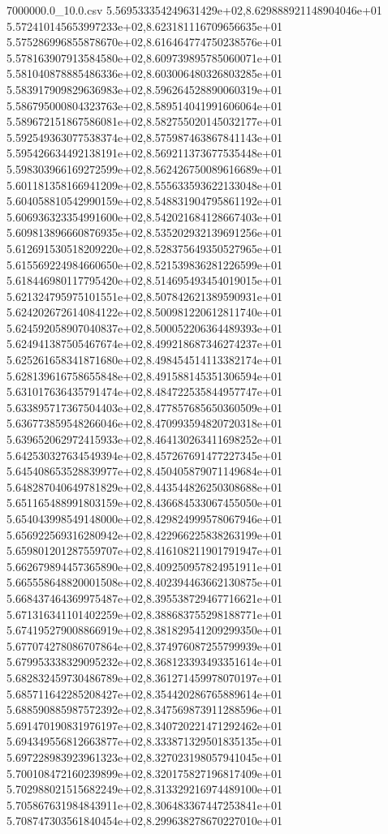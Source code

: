 \begin{filecontents*}{7000000.0_10.0.csv}
5.569533354249631429e+02,8.629888921148904046e+01
5.572410145653997233e+02,8.623181116709656635e+01
5.575286996855878670e+02,8.616464774750238576e+01
5.578163907913584580e+02,8.609739895785060071e+01
5.581040878885486336e+02,8.603006480326803285e+01
5.583917909829636983e+02,8.596264528890060319e+01
5.586795000804323763e+02,8.589514041991606064e+01
5.589672151867586081e+02,8.582755020145032177e+01
5.592549363077538374e+02,8.575987463867841143e+01
5.595426634492138191e+02,8.569211373677535448e+01
5.598303966169272599e+02,8.562426750089616689e+01
5.601181358166941209e+02,8.555633593622133048e+01
5.604058810542990159e+02,8.548831904795861192e+01
5.606936323354991600e+02,8.542021684128667403e+01
5.609813896660876935e+02,8.535202932139691256e+01
5.612691530518209220e+02,8.528375649350527965e+01
5.615569224984660650e+02,8.521539836281226599e+01
5.618446980117795420e+02,8.514695493454019015e+01
5.621324795975101551e+02,8.507842621389590931e+01
5.624202672614084122e+02,8.500981220612811740e+01
5.624592058907040837e+02,8.500052206364489393e+01
5.624941387505467674e+02,8.499218687346274237e+01
5.625261658341871680e+02,8.498454514113382174e+01
5.628139616758655848e+02,8.491588145351306594e+01
5.631017636435791474e+02,8.484722535844957747e+01
5.633895717367504403e+02,8.477857685650360509e+01
5.636773859548266046e+02,8.470993594820720318e+01
5.639652062972415933e+02,8.464130263411698252e+01
5.642530327634549394e+02,8.457267691477227345e+01
5.645408653528839977e+02,8.450405879071149684e+01
5.648287040649781829e+02,8.443544826250308688e+01
5.651165488991803159e+02,8.436684533067455050e+01
5.654043998549148000e+02,8.429824999578067946e+01
5.656922569316280942e+02,8.422966225838263199e+01
5.659801201287559707e+02,8.416108211901791947e+01
5.662679894457365890e+02,8.409250957824951911e+01
5.665558648820001508e+02,8.402394463662130875e+01
5.668437464369975487e+02,8.395538729467716621e+01
5.671316341101402259e+02,8.388683755298188771e+01
5.674195279008866919e+02,8.381829541209299350e+01
5.677074278086707864e+02,8.374976087255799939e+01
5.679953338329095232e+02,8.368123393493351614e+01
5.682832459730486789e+02,8.361271459978070197e+01
5.685711642285208427e+02,8.354420286765889614e+01
5.688590885987572392e+02,8.347569873911288596e+01
5.691470190831976197e+02,8.340720221471292462e+01
5.694349556812663877e+02,8.333871329501835135e+01
5.697228983923961323e+02,8.327023198057941045e+01
5.700108472160239899e+02,8.320175827196817409e+01
5.702988021515682249e+02,8.313329216974489100e+01
5.705867631984843911e+02,8.306483367447253841e+01
5.708747303561840454e+02,8.299638278670227010e+01

\end{filecontents*}
